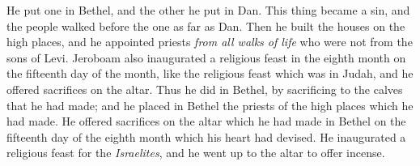 \begin{biblechapter}
\verse He put one in Bethel, and the other he put in Dan.
\verse This thing became a sin, and the people walked before the one as far as Dan.
\verse Then he built the houses on the high places, and he appointed priests \textit{from all walks of life} who were not from the sons of Levi.
\verse Jeroboam also inaugurated a religious feast in the eighth month on the fifteenth day of the month, like the religious feast which was in Judah, and he offered sacrifices on the altar. Thus he did in Bethel, by sacrificing to the calves that he had made; and he placed in Bethel the priests of the high places which he had made.
\verse He offered sacrifices on the altar which he had made in Bethel on the fifteenth day of the eighth month which his heart had devised. He inaugurated a religious feast for the \textit{Israelites}, and he went up to the altar to offer incense.
\end{biblechapter}

